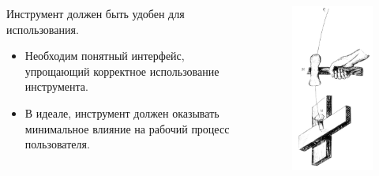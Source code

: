 \documentclass[presentation]{beamer}
\newcommand{\RaisedRightHand}{%
  \raisebox{-.50em}{\Large\HandRight}
}
\begin{document}
\begin{frame}{}
  \begin{columns}
    \begin{column}{0.6\textwidth}
      \RaisedRightHand Инструмент должен быть удобен для
      использования.

      \bigskip

      \begin{itemize}
      \item Необходим понятный интерфейс, упрощающий корректное
        использование инструмента.
      \item В идеале, инструмент должен оказывать минимальное влияние на
        рабочий процесс пользователя.
      \end{itemize}
    \end{column}
    \begin{column}{0.4\textwidth}
      \begin{figure}[htb]
        \centering
        \includegraphics[height=.8\textheight]{hammer-use-0}
      \end{figure}
      \end{column}
  \end{columns}

\end{frame}
\end{document}
